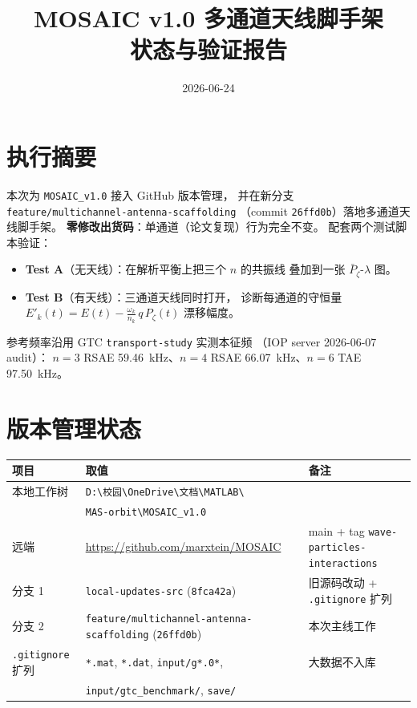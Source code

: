 \documentclass[11pt,a4paper]{article}
\title{\bfseries MOSAIC v1.0 多通道天线脚手架 \\
       \large 状态与验证报告}
\author{}
\date{2026-06-24}
\begin{document}
\maketitle

\section{执行摘要}

本次为 \texttt{MOSAIC\_v1.0} 接入 GitHub 版本管理，
并在新分支 \texttt{feature/multichannel-antenna-scaffolding}
（commit \texttt{26ffd0b}）落地多通道天线脚手架。
\textbf{零修改出货码}：单通道（论文复现）行为完全不变。
配套两个测试脚本验证：

\begin{itemize}[leftmargin=*]
\item \textbf{Test A}（无天线）：在解析平衡上把三个 $n$ 的共振线
      叠加到一张 $\bar P_\zeta\text{-}\lambda$ 图。
\item \textbf{Test B}（有天线）：三通道天线同时打开，
      诊断每通道的守恒量
      $E'_k(t)=E(t)-\frac{\omega_k}{n_k}\,q\,P_\zeta(t)$
      漂移幅度。
\end{itemize}

参考频率沿用 GTC \texttt{transport-study} 实测本征频
（IOP server 2026-06-07 audit）：
$n{=}3$ RSAE \SI{59.46}{kHz}、$n{=}4$ RSAE \SI{66.07}{kHz}、$n{=}6$ TAE \SI{97.50}{kHz}。

\section{版本管理状态}

\begin{table}[ht]
\centering
\small
\begin{tabular}{lll}
\toprule
项目 & 取值 & 备注 \\
\midrule
本地工作树 & \texttt{D:\textbackslash 校园\textbackslash OneDrive\textbackslash 文档\textbackslash MATLAB\textbackslash} & \\
           & \texttt{MAS-orbit\textbackslash MOSAIC\_v1.0} & \\
远端 & \url{https://github.com/marxtein/MOSAIC} & main + tag \texttt{wave-particles-interactions} \\
分支 1 & \texttt{local-updates-src} (\texttt{8fca42a}) & 旧源码改动 + \texttt{.gitignore} 扩列 \\
分支 2 & \texttt{feature/multichannel-antenna-scaffolding} (\texttt{26ffd0b}) & 本次主线工作 \\
\texttt{.gitignore} 扩列 & \verb|*.mat|, \verb|*.dat|, \verb|input/g*.0*|, & 大数据不入库 \\
                       & \verb|input/gtc_benchmark/|, \verb|save/| & \\
\bottomrule
\end{tabular}
\end{table}
\end{document}
